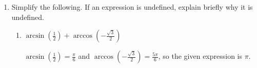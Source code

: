 \documentclass{article}
\begin{document}
\begin{enumerate}
\begin{enumerate}
    \begin{solution}
      \begin{align*}
        2\sin^2(3x) -5 \sin (3x) - 3=0 \\
        \intertext{Let's substitute $u = \sin(3x)$ since all of the
          $x$'s in this equation are part of $\sin(3x)$:}
        2 u^2 -5u - 3 &= 0 \\
        \intertext{This is a quadratic equation, so let's factor it:}
        (2u + 1)(u - 3)&= 0 \\
        \shortintertext{The solutions of this equation are } %
        u &= -\frac{1}{2}, 3 \\
        \intertext{Remember that $u = \sin (3x)$, so we're really solving}
        \sin(3x) &= -\frac{1}{2}, 3 \\
        \intertext{But sin of anything can never be 3 because the range of
          $\sin$ is $[-1, 1]$, so we're really just solving} %
        \sin(3x) &= -\frac{1}{2} \text{ on $[0, \pi]$} \\
        \intertext{Let's substitute $\theta = 3x$; we're interested in values
          of $x$ with $0 \leq x \leq \pi$, so $0 \leq 3x \leq 3\pi$:}
        \sin(\theta) &= \frac{1}{2} \text{ on $[0, 3 \pi]$} \\
        \shortintertext{This has 2 solutions,}
        \theta &= \frac{7\pi}{6}, \frac{11 \pi}{6} \\
        \intertext{Since $\theta = 3x$, $x = \frac{\theta}{3}$:} %
        x &= \boxed{\frac{7\pi}{18}, \frac{11 \pi}{18}} 
      \end{align*}
    \end{solution}
\end{enumerate}

\pspace{\newpage}

  \item Simplify the following. If an expression is undefined, explain briefly why
    it is undefined.

    \begin{enumerate}
    \item
      \begin{problem}[\vfill]
        $\arcsin\!\left(\frac{1}{2}\right) +
        \arccos\!\left(-\frac{\sqrt{3}}{2}\right)$
      \end{problem}

      \begin{solution}
        $\arcsin\!\left( \frac{1}{2} \right) = \frac{\pi}{6}$ and
        $\arccos\!\left(-\frac{\sqrt{3}}{2}\right) = \frac{5 \pi}{6}$, so
        the given expression is $\boxed{\pi}$. 
      \end{solution}


\end{enumerate}
\end{enumerate}
\end{document}
